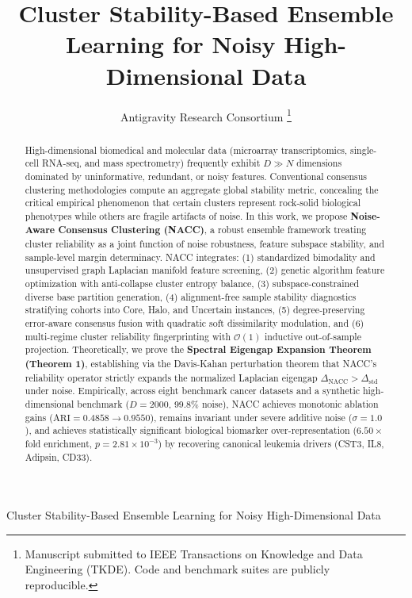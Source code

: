 \documentclass[journal]{IEEEtran}
\begin{document}
\title{Cluster Stability-Based Ensemble Learning for Noisy High-Dimensional Data}

\author{Antigravity Research Consortium%
\thanks{Manuscript submitted to IEEE Transactions on Knowledge and Data Engineering (TKDE). Code and benchmark suites are publicly reproducible.}}

%
{Cluster Stability-Based Ensemble Learning for Noisy High-Dimensional Data}

\maketitle

\begin{abstract}
High-dimensional biomedical and molecular data (microarray transcriptomics, single-cell RNA-seq, and mass spectrometry) frequently exhibit $D \gg N$ dimensions dominated by uninformative, redundant, or noisy features. Conventional consensus clustering methodologies compute an aggregate global stability metric, concealing the critical empirical phenomenon that certain clusters represent rock-solid biological phenotypes while others are fragile artifacts of noise. In this work, we propose \textbf{Noise-Aware Consensus Clustering (NACC)}, a robust ensemble framework treating cluster reliability as a joint function of noise robustness, feature subspace stability, and sample-level margin determinacy. NACC integrates: (1) standardized bimodality and unsupervised graph Laplacian manifold feature screening, (2) genetic algorithm feature optimization with anti-collapse cluster entropy balance, (3) subspace-constrained diverse base partition generation, (4) alignment-free sample stability diagnostics stratifying cohorts into Core, Halo, and Uncertain instances, (5) degree-preserving error-aware consensus fusion with quadratic soft dissimilarity modulation, and (6) multi-regime cluster reliability fingerprinting with $\mathcal{O}(1)$ inductive out-of-sample projection. Theoretically, we prove the \textbf{Spectral Eigengap Expansion Theorem (Theorem 1)}, establishing via the Davis-Kahan perturbation theorem that NACC's reliability operator strictly expands the normalized Laplacian eigengap $\Delta_{\text{NACC}} > \Delta_{\text{std}}$ under noise. Empirically, across eight benchmark cancer datasets and a synthetic high-dimensional benchmark ($D=2000$, 99.8\% noise), NACC achieves monotonic ablation gains ($\text{ARI} = 0.4858 \to 0.9550$), remains invariant under severe additive noise ($\sigma = 1.0$), and achieves statistically significant biological biomarker over-representation ($6.50\times$ fold enrichment, $p = 2.81 \times 10^{-3}$) by recovering canonical leukemia drivers (CST3, IL8, Adipsin, CD33).
\end{abstract}
\end{document}

